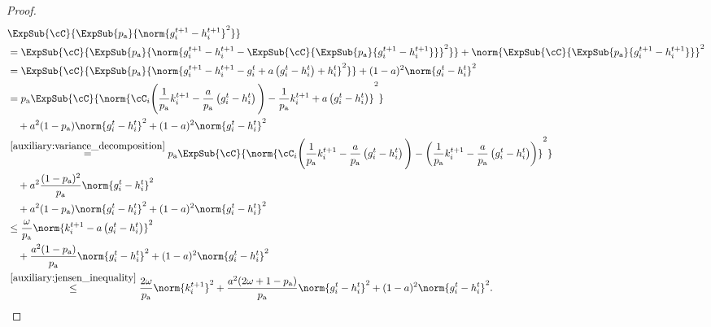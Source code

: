 \documentclass{article}
\newcommand*{\probavailable}{\ensuremath{p_{\textnormal{a}}}}
\begin{document}
\begin{proof}
\begin{align*}
    &\ExpSub{\cC}{\ExpSub{\probavailable}{\norm{g^{t+1}_i - h^{t+1}_i}^2}} \\
    &=\ExpSub{\cC}{\ExpSub{\probavailable}{\norm{g^{t+1}_i - h^{t+1}_i - \ExpSub{\cC}{\ExpSub{\probavailable}{g^{t+1}_i - h^{t+1}_i}}}^2}} + \norm{\ExpSub{\cC}{\ExpSub{\probavailable}{g^{t+1}_i - h^{t+1}_i}}}^2 \\
    &=\ExpSub{\cC}{\ExpSub{\probavailable}{\norm{g^{t+1}_i - h^{t+1}_i - g^{t}_i + a \left(g^{t}_i - h^{t}_i\right) + h^{t}_i}^2}} + (1 - a)^2\norm{g^{t}_i - h^{t}_i}^2 \\
    &=\probavailable\ExpSub{\cC}{\norm{\cC_i\Bigg(\frac{1}{\probavailable}k^{t+1}_i - \frac{a}{\probavailable} \left(g^{t}_i - h^{t}_i\right)\Bigg) - \frac{1}{\probavailable}k^{t+1}_i + a \left(g^{t}_i - h^{t}_i\right)}^2} \\
    &\quad + a^2(1 - \probavailable)\norm{g^{t}_i - h^{t}_i}^2 + (1 - a)^2\norm{g^{t}_i - h^{t}_i}^2 \\
    &\overset{\eqref{auxiliary:variance_decomposition}}{=}\probavailable\ExpSub{\cC}{\norm{\cC_i\Bigg(\frac{1}{\probavailable}k^{t+1}_i - \frac{a}{\probavailable} \left(g^{t}_i - h^{t}_i\right)\Bigg) - \left(\frac{1}{\probavailable}k^{t+1}_i - \frac{a}{\probavailable} \left(g^{t}_i - h^{t}_i\right)\right)}^2} \\
    &\quad + a^2 \frac{(1 - \probavailable)^2}{\probavailable} \norm{g^{t}_i - h^{t}_i}^2 \\
    &\quad + a^2(1 - \probavailable)\norm{g^{t}_i - h^{t}_i}^2 + (1 - a)^2\norm{g^{t}_i - h^{t}_i}^2 \\
    &\leq \frac{\omega}{\probavailable}\norm{k^{t+1}_i - a \left(g^{t}_i - h^{t}_i\right)}^2 \\
    &\quad + \frac{a^2(1 - \probavailable)}{\probavailable} \norm{g^{t}_i - h^{t}_i}^2 + (1 - a)^2\norm{g^{t}_i - h^{t}_i}^2 \\
    &\overset{\eqref{auxiliary:jensen_inequality}}{\leq} \frac{2 \omega}{\probavailable}\norm{k^{t+1}_i}^2 + \frac{a^2(2\omega + 1 - \probavailable)}{\probavailable} \norm{g^{t}_i - h^{t}_i}^2 + (1 - a)^2\norm{g^{t}_i - h^{t}_i}^2.
  \end{align*}
\end{proof}
\end{document}
